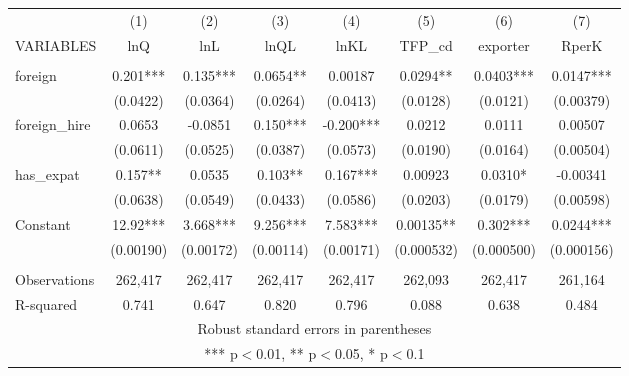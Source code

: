 \documentclass[]{article}
\begin{document}
\begin{tabular}{lccccccc} \hline
 & (1) & (2) & (3) & (4) & (5) & (6) & (7) \\
VARIABLES & lnQ & lnL & lnQL & lnKL & TFP\_cd & exporter & RperK \\ \hline
 &  &  &  &  &  &  &  \\
foreign & 0.201*** & 0.135*** & 0.0654** & 0.00187 & 0.0294** & 0.0403*** & 0.0147*** \\
 & (0.0422) & (0.0364) & (0.0264) & (0.0413) & (0.0128) & (0.0121) & (0.00379) \\
foreign\_hire & 0.0653 & -0.0851 & 0.150*** & -0.200*** & 0.0212 & 0.0111 & 0.00507 \\
 & (0.0611) & (0.0525) & (0.0387) & (0.0573) & (0.0190) & (0.0164) & (0.00504) \\
has\_expat & 0.157** & 0.0535 & 0.103** & 0.167*** & 0.00923 & 0.0310* & -0.00341 \\
 & (0.0638) & (0.0549) & (0.0433) & (0.0586) & (0.0203) & (0.0179) & (0.00598) \\
Constant & 12.92*** & 3.668*** & 9.256*** & 7.583*** & 0.00135** & 0.302*** & 0.0244*** \\
 & (0.00190) & (0.00172) & (0.00114) & (0.00171) & (0.000532) & (0.000500) & (0.000156) \\
 &  &  &  &  &  &  &  \\
Observations & 262,417 & 262,417 & 262,417 & 262,417 & 262,093 & 262,417 & 261,164 \\
 R-squared & 0.741 & 0.647 & 0.820 & 0.796 & 0.088 & 0.638 & 0.484 \\ \hline
\multicolumn{8}{c}{ Robust standard errors in parentheses} \\
\multicolumn{8}{c}{ *** p$<$0.01, ** p$<$0.05, * p$<$0.1} \\
\end{tabular}
\end{document}
